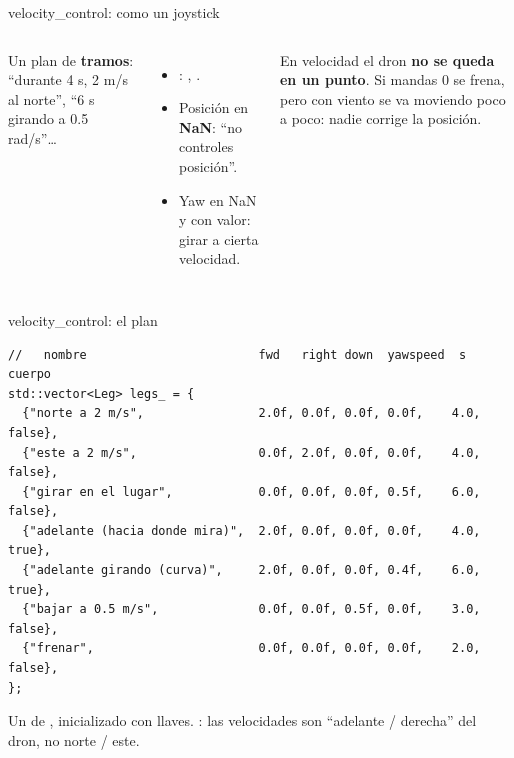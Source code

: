 \begin{frame}{velocity\_control: como un joystick}
  \begin{columns}[c]
    \small
    Un plan de \textbf{tramos}: ``durante 4 s, 2 m/s al norte'', ``6 s girando a 0.5 rad/s''\ldots
    \begin{itemize}
      \item {}: , .
      \item Posición en \textbf{NaN}: ``no controles posición''.
      \item Yaw en NaN y  con valor: girar a cierta velocidad.
    \end{itemize}
    \begin{ojo}
      \small En velocidad el dron \textbf{no se queda en un punto}. Si mandas 0 se frena, pero con viento se
      va moviendo poco a poco: nadie corrige la posición.
    \end{ojo}
  \end{columns}
\end{frame}

\begin{frame}[fragile]{velocity\_control: el plan}
  \begin{lstlisting}[style=cpp,caption={velocity\_control.cpp: cambia, quita o agrega tramos}]
//   nombre                        fwd   right down  yawspeed  s    cuerpo
std::vector<Leg> legs_ = {
  {"norte a 2 m/s",                2.0f, 0.0f, 0.0f, 0.0f,    4.0, false},
  {"este a 2 m/s",                 0.0f, 2.0f, 0.0f, 0.0f,    4.0, false},
  {"girar en el lugar",            0.0f, 0.0f, 0.0f, 0.5f,    6.0, false},
  {"adelante (hacia donde mira)",  2.0f, 0.0f, 0.0f, 0.0f,    4.0, true},
  {"adelante girando (curva)",     2.0f, 0.0f, 0.0f, 0.4f,    6.0, true},
  {"bajar a 0.5 m/s",              0.0f, 0.0f, 0.5f, 0.0f,    3.0, false},
  {"frenar",                       0.0f, 0.0f, 0.0f, 0.0f,    2.0, false},
};
  \end{lstlisting}
  \small Un  de , inicializado con llaves. : las
  velocidades son ``adelante / derecha'' del dron, no norte / este.
\end{frame}

